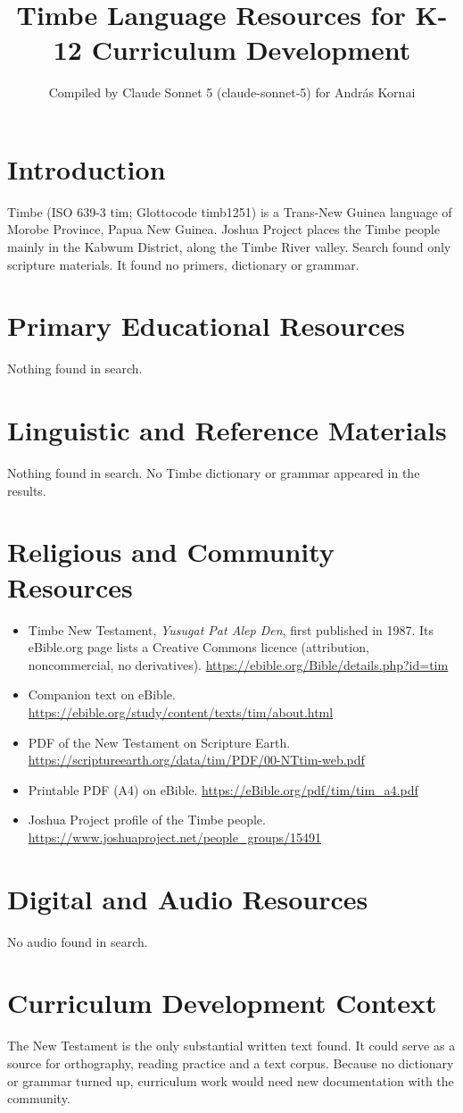 \documentclass[12pt]{article}
\title{Timbe Language Resources for K-12 Curriculum Development}
\author{Compiled by Claude Sonnet 5 (claude-sonnet-5) for Andr\'as Kornai}
\date{}
\begin{document}
\maketitle

\section{Introduction}
Timbe (ISO 639-3 tim; Glottocode timb1251) is a Trans-New Guinea language of Morobe Province, Papua New Guinea. Joshua Project places the Timbe people mainly in the Kabwum District, along the Timbe River valley. Search found only scripture materials. It found no primers, dictionary or grammar.

\section{Primary Educational Resources}
Nothing found in search.

\section{Linguistic and Reference Materials}
Nothing found in search. No Timbe dictionary or grammar appeared in the results.

\section{Religious and Community Resources}
\begin{itemize}
\item Timbe New Testament, \emph{Yusugat Pat Alep Den}, first published in 1987. Its eBible.org page lists a Creative Commons licence (attribution, noncommercial, no derivatives). \url{https://ebible.org/Bible/details.php?id=tim}
\item Companion text on eBible. \url{https://ebible.org/study/content/texts/tim/about.html}
\item PDF of the New Testament on Scripture Earth. \url{https://scriptureearth.org/data/tim/PDF/00-NTtim-web.pdf}
\item Printable PDF (A4) on eBible. \url{https://eBible.org/pdf/tim/tim_a4.pdf}
\item Joshua Project profile of the Timbe people. \url{https://www.joshuaproject.net/people_groups/15491}
\end{itemize}

\section{Digital and Audio Resources}
No audio found in search.

\section{Curriculum Development Context}
The New Testament is the only substantial written text found. It could serve as a source for orthography, reading practice and a text corpus. Because no dictionary or grammar turned up, curriculum work would need new documentation with the community.
\end{document}

